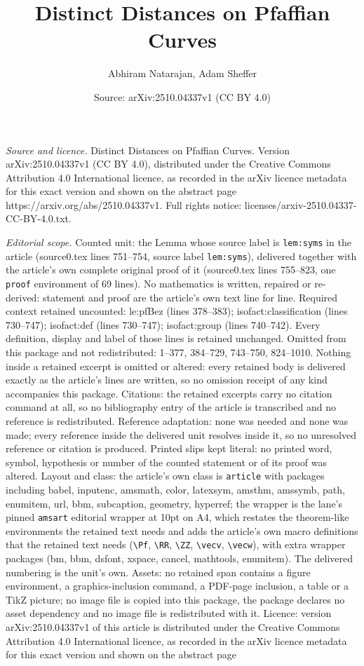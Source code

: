 \documentclass[10pt,a4paper]{amsart}
\title[Distinct Distances on Pfaffian Curves]{Distinct Distances on Pfaffian Curves}
\author{Abhiram Natarajan, Adam Sheffer}
\date{Source: arXiv:2510.04337v1 (CC BY 4.0)}
\begin{document}
\maketitle

\noindent\emph{Source and licence.} Distinct Distances on Pfaffian Curves. Version arXiv:2510.04337v1 (CC BY 4.0), distributed under the Creative Commons Attribution 4.0 International licence, as recorded in the arXiv licence metadata for this exact version and shown on the abstract page https://arxiv.org/abs/2510.04337v1. Full rights notice: licenses/arxiv-2510.04337-CC-BY-4.0.txt.\par\smallskip

\noindent\textit{Editorial scope.} Counted unit: the Lemma whose source label is \texttt{lem:syms} in the article (source0.tex lines 751--754, source label \texttt{lem:syms}), delivered together with the article's own complete original proof of it (source0.tex lines 755--823, one \texttt{proof} environment of 69 lines). No mathematics is written, repaired or re-derived: statement and proof are the article's own text line for line. Required context retained uncounted: le:pfBez (lines 378--383); isofact:classification (lines 730--747); isofact:def (lines 730--747); isofact:group (lines 740--742). Every definition, display and label of those lines is retained unchanged. Omitted from this package and not redistributed: 1--377, 384--729, 743--750, 824--1010. Nothing inside a retained excerpt is omitted or altered: every retained body is delivered exactly as the article's lines are written, so no omission receipt of any kind accompanies this package. Citations: the retained excerpts carry no citation command at all, so no bibliography entry of the article is transcribed and no reference is redistributed. Reference adaptation: none was needed and none was made; every reference inside the delivered unit resolves inside it, so no unresolved reference or citation is produced. Printed slips kept literal: no printed word, symbol, hypothesis or number of the counted statement or of its proof was altered. Layout and class: the article's own class is \texttt{article} with packages including babel, inputenc, amsmath, color, latexsym, amsthm, amssymb, path, enumitem, url, bbm, subcaption, geometry, hyperref; the wrapper is the lane's pinned \texttt{amsart} editorial wrapper at 10pt on A4, which restates the theorem-like environments the retained text needs and adds the article's own macro definitions that the retained text needs (\texttt{\textbackslash Pf}, \texttt{\textbackslash RR}, \texttt{\textbackslash ZZ}, \texttt{\textbackslash vecv}, \texttt{\textbackslash vecw}), with extra wrapper packages (bm, bbm, dsfont, xspace, cancel, mathtools, enumitem). The delivered numbering is the unit's own. Assets: no retained span contains a figure environment, a graphics-inclusion command, a PDF-page inclusion, a table or a TikZ picture; no image file is copied into this package, the package declares no asset dependency and no image file is redistributed with it. Licence: version arXiv:2510.04337v1 of this article is distributed under the Creative Commons Attribution 4.0 International licence, as recorded in the arXiv licence metadata for this exact version and shown on the abstract page 
\end{document}
